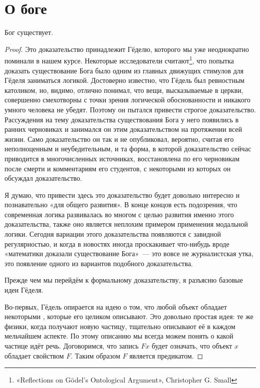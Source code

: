 \section{О боге}

\begin{thm}
Бог существует.
\end{thm}
\begin{proof}
Это доказательство принадлежит Гёделю, которого мы уже неоднократно поминали в нашем курсе. Некоторые исследователи считают\footnote{«Reflections on Gödel’s Ontological Argument», Christopher G. Small}, что попытка доказать существование Бога было одним из главных движущих стимулов для Гёделя заниматься логикой. Достоверно известно, что Гёдель был ревностным католиком, но, видимо, отлично понимал, что вещи, высказываемые в церкви, совершенно смехотворны с точки зрения логической обоснованности и никакого умного человека не убедят. Поэтому он пытался привести строгое доказательство. Рассуждения на тему доказательства существования Бога у него появились в ранних черновиках и занимался он этим доказательством на протяжении всей жизни. Само доказательство он так и не опубликовал, вероятно, считая его неполноценным и неубедительным, и та форма, в которой доказательство сейчас приводится в многочисленных источниках, восстановлена по его черновикам после смерти и комментариям его студентов, с некоторыми из которых он обсуждал доказательство.

Я думаю, что привести здесь это доказательство будет довольно интересно и познавательно «для общего развития». В конце концов есть подозрения, что современная логика развивалась во многом с целью развития именно этого доказательства, также оно является неплохим примером применения модальной логики. Сегодня вариации этого доказательства появляются с завидной регулярностью, и когда в новостях иногда проскакивает что-нибудь вроде «математики доказали существование Бога»~— это вовсе не журналистская утка, это появление одного из вариантов подобного доказательства.

Прежде чем мы перейдём к формальному доказательству, я разъясню базовые идеи Гёделя.

Во-первых, Гёдель опирается на идею о том, что любой объект обладает некоторыми , которые его целиком описывают. Это довольно простая идея: те же физики, когда получают новую частицу, тщательно описывают её в каждом мельчайшем аспекте. По этому описанию мы всегда можем понять о какой частице идёт речь. Договоримся, что запись $Fx$ будет означать, что объект $x$ обладает свойством $F$. Таким образом $F$ является предикатом.


\end{proof}
